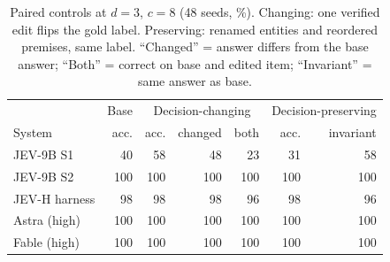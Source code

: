 \begin{table}[t]
\centering\small
\caption{Paired controls at $d{=}3$, $c{=}8$ (48 seeds, \%). Changing: one verified edit flips the gold label. Preserving: renamed entities and reordered premises, same label. ``Changed'' = answer differs from the base answer; ``Both'' = correct on base and edited item; ``Invariant'' = same answer as base.}
\label{tab:controls}
\begin{tabular}{@{}lrrrrrr@{}}
\toprule
& Base & \multicolumn{3}{c}{Decision-changing} & \multicolumn{2}{c}{Decision-preserving} \\
System & acc. & acc. & changed & both & acc. & invariant \\
\midrule
JEV-9B S1 & 40 & 58 & 48 & 23 & 31 & 58 \\
JEV-9B S2 & 100 & 100 & 100 & 100 & 100 & 100 \\
JEV-H harness & 98 & 98 & 98 & 96 & 98 & 96 \\
Astra (high) & 100 & 100 & 100 & 100 & 100 & 100 \\
Fable (high) & 100 & 100 & 100 & 100 & 100 & 100 \\
\bottomrule
\end{tabular}
\end{table}
